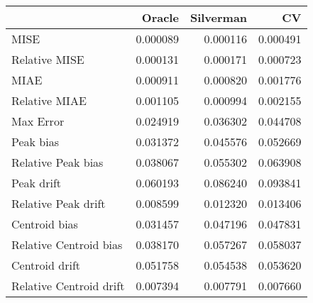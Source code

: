 \begin{tabular}{lrrr}
  \hline
 & Oracle & Silverman & CV \\ 
  \hline
MISE & 0.000089 & 0.000116 & 0.000491 \\ 
  Relative MISE & 0.000131 & 0.000171 & 0.000723 \\ 
  MIAE & 0.000911 & 0.000820 & 0.001776 \\ 
  Relative MIAE & 0.001105 & 0.000994 & 0.002155 \\ 
  Max Error & 0.024919 & 0.036302 & 0.044708 \\ 
  Peak bias & 0.031372 & 0.045576 & 0.052669 \\ 
  Relative Peak bias & 0.038067 & 0.055302 & 0.063908 \\ 
  Peak drift & 0.060193 & 0.086240 & 0.093841 \\ 
  Relative Peak drift & 0.008599 & 0.012320 & 0.013406 \\ 
  Centroid bias & 0.031457 & 0.047196 & 0.047831 \\ 
  Relative Centroid bias & 0.038170 & 0.057267 & 0.058037 \\ 
  Centroid drift & 0.051758 & 0.054538 & 0.053620 \\ 
  Relative Centroid drift & 0.007394 & 0.007791 & 0.007660 \\ 
   \hline
\end{tabular}
